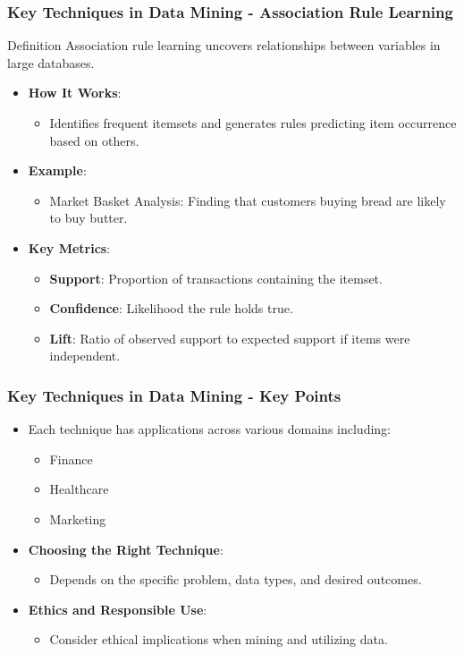 \documentclass[aspectratio=169]{beamer}
\begin{document}
\begin{frame}[fragile]
    \frametitle{Key Techniques in Data Mining - Association Rule Learning}
    \begin{block}{Definition}
        Association rule learning uncovers relationships between variables in large databases.
    \end{block}
    \begin{itemize}
        \item \textbf{How It Works}:
        \begin{itemize}
            \item Identifies frequent itemsets and generates rules predicting item occurrence based on others.
        \end{itemize}
        \item \textbf{Example}:
            \begin{itemize}
                \item Market Basket Analysis: Finding that customers buying bread are likely to buy butter.
            \end{itemize}
        \item \textbf{Key Metrics}:
            \begin{itemize}
                \item \textbf{Support}: Proportion of transactions containing the itemset.
                \item \textbf{Confidence}: Likelihood the rule holds true.
                \item \textbf{Lift}: Ratio of observed support to expected support if items were independent.
            \end{itemize}
    \end{itemize}
\end{frame}

\begin{frame}[fragile]
    \frametitle{Key Techniques in Data Mining - Key Points}
    \begin{itemize}
        \item Each technique has applications across various domains including:
        \begin{itemize}
            \item Finance
            \item Healthcare
            \item Marketing
        \end{itemize}
        \item \textbf{Choosing the Right Technique}:
        \begin{itemize}
            \item Depends on the specific problem, data types, and desired outcomes.
        \end{itemize}
        \item \textbf{Ethics and Responsible Use}:
        \begin{itemize}
            \item Consider ethical implications when mining and utilizing data.
        \end{itemize}
    \end{itemize}
\end{frame}
\end{document}
